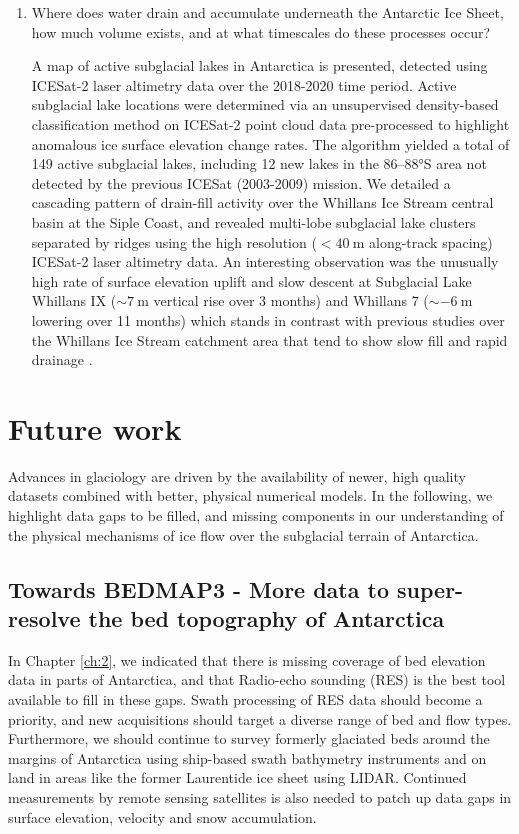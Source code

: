 \begin{enumerate}
  \item Where does water drain and accumulate underneath the Antarctic Ice Sheet, how much volume exists, and at what timescales do these processes occur?

  A map of active subglacial lakes in Antarctica is presented, detected using ICESat-2 laser altimetry data over the 2018-2020 time period.
  Active subglacial lake locations were determined via an unsupervised density-based classification method on ICESat-2 point cloud data pre-processed to highlight anomalous ice surface elevation change rates.
  The algorithm yielded a total of 149 active subglacial lakes, including 12 new lakes in the 86--88°S area not detected by the previous ICESat (2003-2009) mission.
  We detailed a cascading pattern of drain-fill activity over the Whillans Ice Stream central basin at the Siple Coast, and revealed multi-lobe subglacial lake clusters separated by ridges using the high resolution ($<\SI{40}{\metre}$ along-track spacing) ICESat-2 laser altimetry data.
  An interesting observation was the unusually high rate of surface elevation uplift and slow descent at Subglacial Lake Whillans IX ($\sim\SI{7}{\metre}$ vertical rise over 3 months) and Whillans 7 ($\sim\SI{-6}{\metre}$ lowering over 11 months) which stands in contrast with previous studies over the Whillans Ice Stream catchment area that tend to show slow fill and rapid drainage \citep{SiegfriedThirteenyearssubglacial2018,SiegfriedEpisodicicevelocity2016}.

\end{enumerate}

\section{Future work}

Advances in glaciology are driven by the availability of newer, high quality datasets combined with better, physical numerical models.
In the following, we highlight data gaps to be filled, and missing components in our understanding of the physical mechanisms of ice flow over the subglacial terrain of Antarctica.

\subsection{Towards BEDMAP3 - More data to super-resolve the bed topography of Antarctica}

In Chapter \ref{ch:2}, we indicated that there is missing coverage of bed elevation data in parts of Antarctica, and that Radio-echo sounding (\gls{RES}) is the best tool available to fill in these gaps.
Swath processing of RES data \citep[e.g.][]{HolschuhLinkingpostglaciallandscapes2020} should become a priority, and new acquisitions should target a diverse range of bed and flow types.
Furthermore, we should continue to survey formerly glaciated beds around the margins of Antarctica using ship-based swath bathymetry instruments and on land in areas like the former Laurentide ice sheet using LIDAR.
Continued measurements by remote sensing satellites is also needed to patch up data gaps in surface elevation, velocity and snow accumulation.

